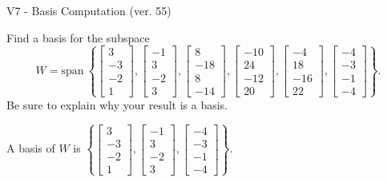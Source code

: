 \begin{exercise}
  \begin{exerciseTitle}V7 - Basis Computation (ver. 55)\end{exerciseTitle}
  \begin{exerciseStatement}
    Find a basis for the subspace 
\[W=\mathrm{span}\ \left\{\left[\begin{array}{r}
3 \\
-3 \\
-2 \\
1
\end{array}\right] , \left[\begin{array}{r}
-1 \\
3 \\
-2 \\
3
\end{array}\right] , \left[\begin{array}{r}
8 \\
-18 \\
8 \\
-14
\end{array}\right] , \left[\begin{array}{r}
-10 \\
24 \\
-12 \\
20
\end{array}\right] , \left[\begin{array}{r}
-4 \\
18 \\
-16 \\
22
\end{array}\right] , \left[\begin{array}{r}
-4 \\
-3 \\
-1 \\
-4
\end{array}\right]\right\}.\]
 Be sure to explain why your result is a basis.


  \end{exerciseStatement}
  \begin{exerciseAnswer}
   A basis of \(W\) is  \(\left\{\left[\begin{array}{r}
3 \\
-3 \\
-2 \\
1
\end{array}\right] , \left[\begin{array}{r}
-1 \\
3 \\
-2 \\
3
\end{array}\right] , \left[\begin{array}{r}
-4 \\
-3 \\
-1 \\
-4
\end{array}\right]\right\}\).
  


  \end{exerciseAnswer}
\end{exercise}